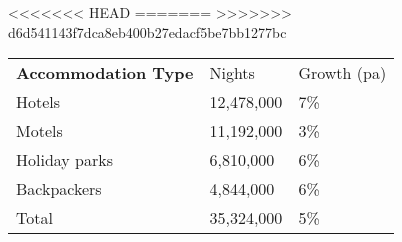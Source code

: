 <<<<<<< HEAD
=======
>>>>>>> d6d541143f7dca8eb400b27edacf5be7bb1277bc
\begin{tabular}[t]{p{4.5cm}>{\hfill}p{1.3cm}>{\hfill}p{1.7cm}}
 \textbf{Accommodation Type} & Nights & Growth (pa) \\ 
 Hotels & 12,478,000 & 7\% \\ 
  Motels & 11,192,000 & 3\% \\ 
  Holiday parks &  6,810,000 & 6\% \\ 
  Backpackers &  4,844,000 & 6\% \\ 
  Total & 35,324,000 & 5\% \\ 
  \end{tabular}
